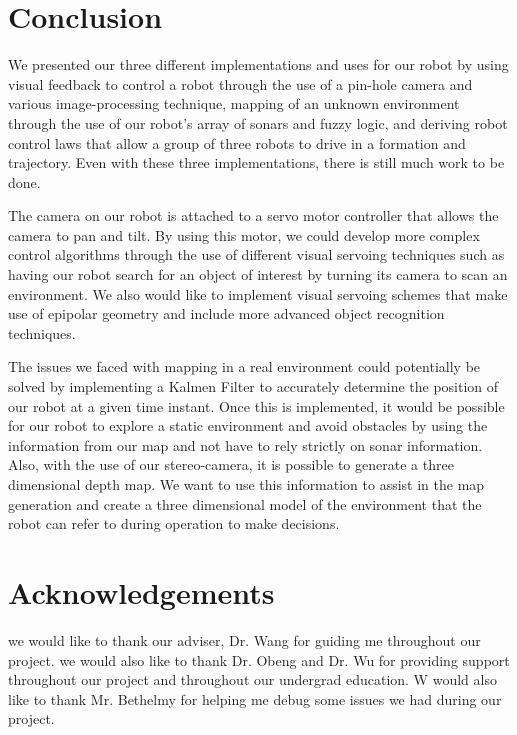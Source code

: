 \documentclass[12pt]{article}
\begin{document}

\newpage


\section{Conclusion}

We presented our three different implementations and uses for our robot by using visual feedback to control a robot through the use of a pin-hole camera and various image-processing technique, mapping of an unknown environment through the use of our robot's array of sonars and fuzzy logic, and deriving robot control laws that allow a group of three robots to drive in a formation and trajectory. Even with these three implementations, there is still much work to be done. 

The camera on our robot is attached to a servo motor controller that allows the camera to pan and tilt. By using this motor, we could develop more complex control algorithms through the use of different visual servoing techniques such as having our robot search for an object of interest by turning its camera to scan an environment. We also would like to implement visual servoing schemes that make use of epipolar geometry and include more advanced object recognition techniques.

The issues we faced with mapping in a real environment could potentially be solved by implementing a Kalmen Filter to accurately determine the position of our robot at a given time instant. Once this is implemented, it would be possible for our robot to explore a static environment and avoid obstacles by using the information from our map and not have to rely strictly on sonar information. Also, with the use of our stereo-camera, it is possible to generate a three dimensional depth map. We want to use this information to assist in the map generation and create a three dimensional model of the environment that the robot can refer to during operation to make decisions.

\newpage

\section{Acknowledgements}

we would like to thank our adviser, Dr. Wang for guiding me throughout our project. we would also like to thank Dr. Obeng and Dr. Wu for providing support throughout our project and throughout our undergrad education. W would also like to thank Mr. Bethelmy for helping me debug some issues we had during our project.
\end{document}

